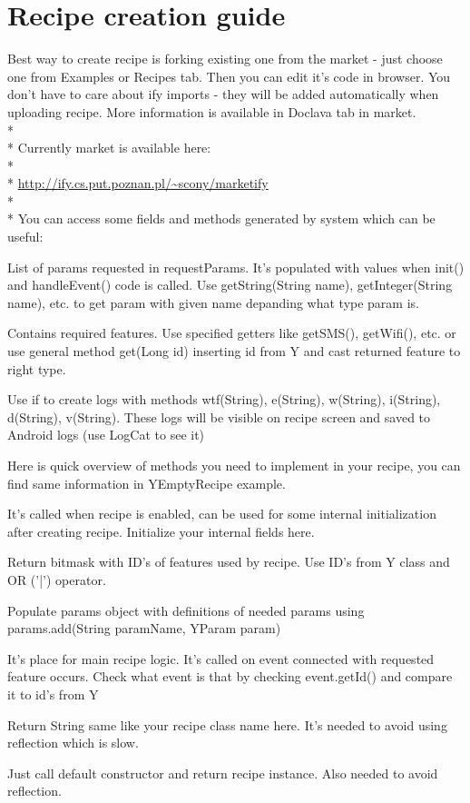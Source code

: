 \documentclass[11pt,a4paper,polish,thesis]{dcsbook}
\begin{document}
\chapter{Recipe creation guide}
Best way to create recipe is forking existing one from the market - just choose one from Examples or Recipes tab. Then you can edit it's code in browser. You don't have to care about ify imports - they will be added automatically when uploading recipe. More information is available in Doclava tab in market. \\*\\*
Currently market is available here:\\*\\*
\url{http://ify.cs.put.poznan.pl/~scony/marketify}\\*\\*
You can access some fields and methods generated by system which can be useful:
\begin{description}[style=nextline]
\item[getParams()] 
List of params requested in requestParams. It's populated with values when init() and handleEvent() code is called. Use getString(String name), getInteger(String name), etc. to get param with given name depanding what type param is.
\item[getFeatures()] 
Contains required features. Use specified getters like getSMS(), getWifi(), etc. or use general method get(Long id) inserting id from Y and cast returned feature to right type.
\item[Log (it's field)]
Use if to create logs with methods wtf(String), e(String), w(String), i(String), d(String), v(String). These logs will be visible on recipe screen and saved to Android logs (use LogCat to see it)
\end{description}
Here is quick overview of methods you need to implement in your recipe, you can find same information in YEmptyRecipe example.
\begin{description}[style=nextline]
\item[protected void init()]
It's called when recipe is enabled, can be used for some internal initialization after creating recipe. Initialize your internal fields here.
\item[public long requestFeatures()]
Return bitmask with ID's of features used by recipe. Use ID's from Y class and OR ('|') operator.
\item[public void requestParams(YParamList params)]
Populate params object with definitions of needed params using params.add(String paramName, YParam param)
\item[protected void handleEvent(YEvent event)]
It's place for main recipe logic. It's called on event connected with requested feature occurs. Check what event is that by checking event.getId() and compare it to id's from Y
\item[public String getName()]
Return String same like your recipe class name here. It's needed to avoid using reflection which is slow.
\item[public YReceipt newInstance()]
Just call default constructor and return recipe instance. Also needed to avoid reflection.
\end{description}
\end{document}
